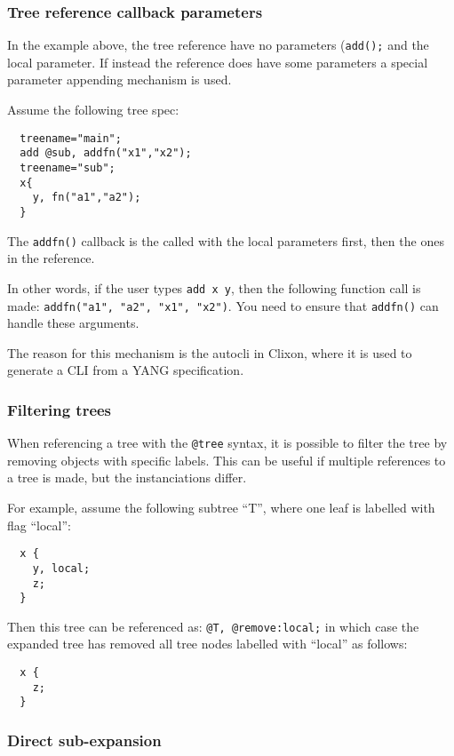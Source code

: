 \documentclass[a4paper, 10pt] {article}
\begin{document}
\subsubsection{Tree reference callback parameters}

In the example above, the tree reference have no parameters ({\tt add();} and the local parameter. If instead the reference
does have some parameters a special parameter appending mechanism is used.

Assume the following tree spec:

\begin{verbatim}
  treename="main";
  add @sub, addfn("x1","x2");
  treename="sub";
  x{
    y, fn("a1","a2");
  }
\end{verbatim}

The {\tt addfn()} callback is the called with the local parameters first, then the ones in the reference.

In other words, if the user types {\tt add x y}, then the following function call is made: {\tt addfn("a1", "a2", "x1", "x2")}. You need to ensure that {\tt addfn()} can handle these arguments. 

The reason for this mechanism is the autocli in Clixon, where it is used to generate a CLI from a YANG specification.

\subsubsection{Filtering trees}

When referencing a tree with the {\tt @tree} syntax, it is possible to filter the tree by removing
objects with specific labels. This can be useful if multiple references to a tree is made, but
the instanciations differ.

For example, assume the following subtree ``T'', where one leaf is labelled with flag ``local'':
\begin{verbatim}
  x {
    y, local;
    z;
  }
\end{verbatim}

Then this tree can be referenced as: {\tt @T, @remove:local;} in which case the expanded tree has removed all tree nodes labelled with ``local'' as follows:
\begin{verbatim}
  x {
    z;
  }
\end{verbatim}

\subsubsection{Direct sub-expansion}
\end{document}
